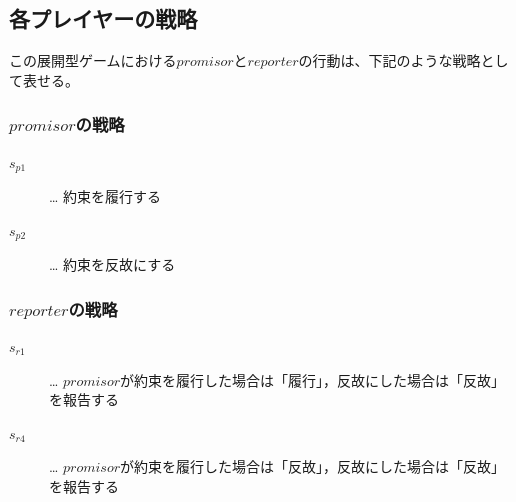 \clearpage


\subsection{各プレイヤーの戦略}
この展開型ゲームにおける$promisor$と$reporter$の行動は、下記のような戦略として表せる。

\subsubsection{$promisor$の戦略}
\begin{description}
  \item[$s_{p1}$]… 約束を履行する
  \item[$s_{p2}$]… 約束を反故にする
\end{description}

\subsubsection{$reporter$の戦略}
\begin{description}
  \item[$s_{r1}$]… $promisor$が約束を履行した場合は「履行」，反故にした場合は「反故」を報告する
  \item[$s_{r4}$]… $promisor$が約束を履行した場合は「反故」，反故にした場合は「反故」を報告する
\end{description}




